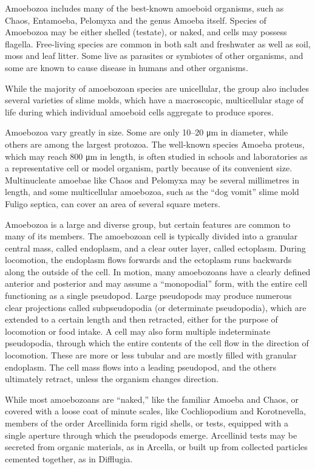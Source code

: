 Amoebozoa includes many of the best-known amoeboid organisms, such as Chaos, Entamoeba, Pelomyxa and the genus Amoeba itself. Species of Amoebozoa may be either shelled (testate), or naked, and cells may possess flagella. Free-living species are common in both salt and freshwater as well as soil, moss and leaf litter. Some live as parasites or symbiotes of other organisms, and some are known to cause disease in humans and other organisms.

While the majority of amoebozoan species are unicellular, the group also includes several varieties of slime molds, which have a macroscopic, multicellular stage of life during which individual amoeboid cells aggregate to produce spores.

Amoebozoa vary greatly in size. Some are only 10--20 μm in diameter, while others are among the largest protozoa. The well-known species Amoeba proteus, which may reach 800 μm in length, is often studied in schools and laboratories as a representative cell or model organism, partly because of its convenient size. Multinucleate amoebae like Chaos and Pelomyxa may be several millimetres in length, and some multicellular amoebozoa, such as the ``dog vomit'' slime mold Fuligo septica, can cover an area of several square meters.

Amoebozoa is a large and diverse group, but certain features are common to many of its members. The amoebozoan cell is typically divided into a granular central mass, called endoplasm, and a clear outer layer, called ectoplasm. During locomotion, the endoplasm flows forwards and the ectoplasm runs backwards along the outside of the cell. In motion, many amoebozoans have a clearly defined anterior and posterior and may assume a ``monopodial'' form, with the entire cell functioning as a single pseudopod. Large pseudopods may produce numerous clear projections called subpseudopodia (or determinate pseudopodia), which are extended to a certain length and then retracted, either for the purpose of locomotion or food intake. A cell may also form multiple indeterminate pseudopodia, through which the entire contents of the cell flow in the direction of locomotion. These are more or less tubular and are mostly filled with granular endoplasm. The cell mass flows into a leading pseudopod, and the others ultimately retract, unless the organism changes direction.

While most amoebozoans are ``naked,'' like the familiar Amoeba and Chaos, or covered with a loose coat of minute scales, like Cochliopodium and Korotnevella, members of the order Arcellinida form rigid shells, or tests, equipped with a single aperture through which the pseudopods emerge. Arcellinid tests may be secreted from organic materials, as in Arcella, or built up from collected particles cemented together, as in Difflugia.

